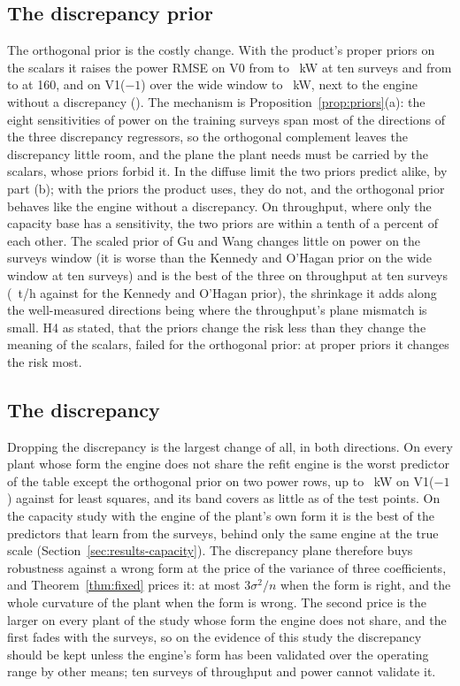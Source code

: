 \subsection{The discrepancy prior}

The orthogonal prior is the costly change. With the product's proper priors on the scalars it raises the power RMSE on V0 from
\rVzeroSTenKwKo{} to \rVzeroSTenKwOrth~kW at ten surveys and from \rVzeroSBigKwKo{} to \rVzeroSBigKwOrth{} at 160, and on V1($-1$)
over the wide window to \rVamWFortyKwOrth~kW, next to the engine without a discrepancy (\rVamWFortyKwRefit). The mechanism is
Proposition~\ref{prop:priors}(a): the eight sensitivities of power on the training surveys span most of the directions of the
three discrepancy regressors, so the orthogonal complement leaves the discrepancy little room, and the plane the plant needs
must be carried by the scalars, whose priors forbid it. In the diffuse limit the two priors predict alike, by part (b); with the
priors the product uses, they do not, and the orthogonal prior behaves like the engine without a discrepancy. On throughput,
where only the capacity base has a sensitivity, the two priors are within a tenth of a percent of each other. The scaled prior
of Gu and Wang changes little on power on the surveys window (it is \scaledWideWorse\pct{} worse than the Kennedy and O'Hagan prior on
the wide window at ten surveys) and is the best of the three on throughput at ten surveys (\rVzeroSTenTphSc~t/h against
\rVzeroSTenTphKo{} for the Kennedy and O'Hagan prior), the shrinkage it adds along the well-measured directions being where the
throughput's plane mismatch is small. H4 as stated, that the priors change the risk less than they change the meaning of the
scalars, failed for the orthogonal prior: at proper priors it changes the risk most.

\subsection{The discrepancy}

Dropping the discrepancy is the largest change of all, in both directions. On every plant whose form the engine does not share
the refit engine is the worst predictor of the table except the orthogonal prior on two power rows, up to \rVamWFortyKwRefit~kW on V1($-1$) against \rVamWFortyKwLs{} for
least squares, and its band covers as little as \covRefitMin{} of the test points. On the capacity study with the engine of the
plant's own form it is the best of the predictors that learn from the surveys, behind only the same engine at the true scale
(Section~\ref{sec:results-capacity}). The discrepancy plane therefore
buys robustness against a wrong form at the price of the variance of three coefficients, and Theorem~\ref{thm:fixed} prices
it: at most $3\sigma^2/n$ when the form is right, and the whole curvature of the plant when the form is wrong. The second price
is the larger on every plant of the study whose form the engine does not share, and the first fades with the surveys, so on
the evidence of this study the discrepancy should be kept unless the engine's form has been validated over the operating range
by other means; ten surveys of throughput and power cannot validate it.

